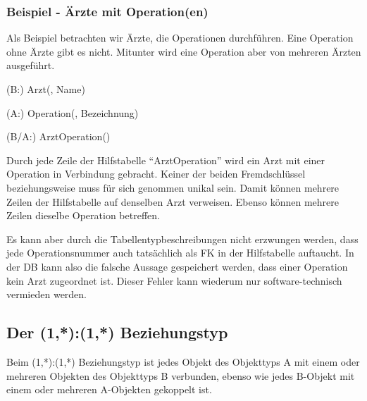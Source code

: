\subsubsection{Beispiel - Ärzte mit Operation(en)}
Als Beispiel betrachten wir Ärzte, die Operationen durchführen. Eine Operation ohne Ärzte gibt es nicht. Mitunter wird eine Operation aber von mehreren Ärzten ausgeführt.
\begin{center}
\end{center}
\begin{small}
    (B:) Arzt(, Name)

    (A:) Operation(, Bezeichnung)

    (B/A:) ArztOperation()
\end{small}
Durch jede Zeile der Hilfstabelle \enquote{ArztOperation} wird ein Arzt mit einer Operation in Verbindung gebracht. Keiner der beiden Fremdschlüssel  beziehungsweise  muss für sich genommen unikal sein. Damit können mehrere Zeilen der Hilfstabelle auf denselben Arzt verweisen. Ebenso können mehrere Zeilen dieselbe Operation betreffen.

Es kann aber durch die Tabellentypbeschreibungen nicht erzwungen werden, dass jede Operationsnummer auch tatsächlich als FK in der Hilfstabelle auftaucht. In der DB kann also die falsche Aussage gespeichert werden, dass einer Operation kein Arzt zugeordnet ist. Dieser Fehler kann wiederum nur software-technisch vermieden werden.
\subsection{Der (1,*):(1,*) Beziehungstyp}
Beim (1,*):(1,*) Beziehungstyp ist jedes Objekt des Objekttyps A mit einem oder mehreren Objekten des Objekttyps B verbunden, ebenso wie jedes B-Objekt mit einem oder mehreren A-Objekten gekoppelt ist.

